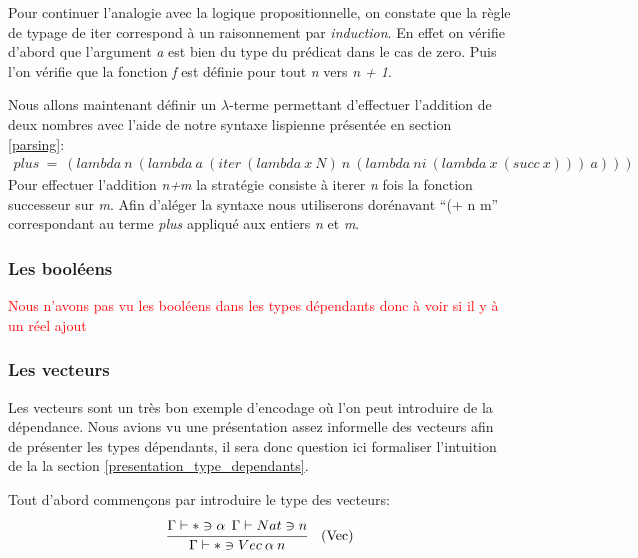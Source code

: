 \documentclass {article}
\theoremstyle{definition}
\theoremstyle{remark}
\newcommand{\todo}[1]{\textcolor{red}{#1}}
\begin{document}
Pour continuer l'analogie avec la logique propositionnelle, on constate que la règle de typage de iter correspond à un raisonnement par
\emph{induction}. En effet on vérifie d'abord que l'argument \emph{a} est bien du type du prédicat dans le cas de zero. 
Puis l'on vérifie que la fonction \emph{f} est définie pour tout \emph{n} vers \emph{n + 1}.

Nous allons maintenant définir un $\lambda$-terme permettant d'effectuer l'addition de deux nombres avec l'aide de notre syntaxe
lispienne présentée en section \ref{parsing}:
\begin{align*}
  plus\:=\: (lambda\:n\:(lambda\:a\:(iter\:(lambda\:x\:N)\:n\:(lambda\:ni\:(lambda\:x\:(succ\:x)))\:a)))
\end{align*}
Pour effectuer l'addition \emph{n\:+\:m} la stratégie consiste à iterer \emph{n} fois la fonction successeur sur \emph{m}.
Afin d'aléger la syntaxe nous utiliserons dorénavant ``(+ n m'' correspondant au terme \emph{plus} appliqué aux entiers \emph{n} et
\emph{m}.

\subsubsection{Les booléens}

\todo{Nous n'avons pas vu les booléens dans les types dépendants donc à voir si il y à un réel ajout}

\subsubsection{Les vecteurs}

Les vecteurs sont un très bon exemple d'encodage où l'on peut introduire de la dépendance. Nous avions vu une présentation assez informelle
des vecteurs afin de présenter les types dépendants, il sera donc question ici formaliser l'intuition de la
la section \ref{presentation_type_dependants}. 

Tout d'abord commençons par introduire le type des vecteurs:
\begin{align*}
  &\cfrac{\Gamma\vdash * \ni \alpha\:\:\Gamma\vdash Nat \ni n}
  {\Gamma\vdash * \ni Vec\: \alpha\:n }&\mbox{(Vec)} \\
\end{align*}
\end{document}

